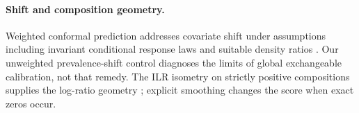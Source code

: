 \paragraph{Shift and composition geometry.}
Weighted conformal prediction addresses covariate shift under assumptions including invariant conditional response laws and suitable density ratios \citep{tibshirani2019shift}. Our unweighted prevalence-shift control diagnoses the limits of global exchangeable calibration, not that remedy. The ILR isometry on strictly positive compositions supplies the log-ratio geometry \citep{egozcue2003ilr}; explicit smoothing changes the score when exact zeros occur.
